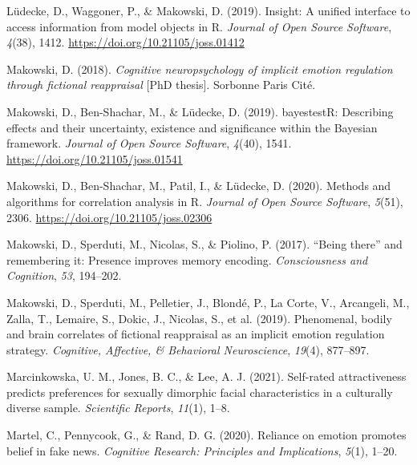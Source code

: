 \documentclass[
  man,floatsintext]{apa6}
\newlength{\cslhangindent}
\newlength{\cslentryspacingunit} %
\newenvironment{CSLReferences}[2] %
 {%
  \setlength{\parindent}{0pt}
  \ifodd #1
  \let\oldpar\par
  \def\par{\hangindent=\cslhangindent\oldpar}
  \fi
  \setlength{\parskip}{#2\cslentryspacingunit}
 }%
 {}
\begin{document}
\begin{CSLReferences}{1}{0}
\leavevmode{}%
Lüdecke, D., Waggoner, P., \& Makowski, D. (2019). Insight: A unified interface to access information from model objects in {R}. \emph{Journal of Open Source Software}, \emph{4}(38), 1412. \url{https://doi.org/10.21105/joss.01412}

\leavevmode{}%
Makowski, D. (2018). \emph{Cognitive neuropsychology of implicit emotion regulation through fictional reappraisal} {[}PhD thesis{]}. Sorbonne Paris Cit{é}.

\leavevmode{}%
Makowski, D., Ben-Shachar, M., \& Lüdecke, D. (2019). {bayestestR}: Describing effects and their uncertainty, existence and significance within the {Bayesian} framework. \emph{Journal of Open Source Software}, \emph{4}(40), 1541. \url{https://doi.org/10.21105/joss.01541}

\leavevmode{}%
Makowski, D., Ben-Shachar, M., Patil, I., \& Lüdecke, D. (2020). Methods and algorithms for correlation analysis in {R}. \emph{Journal of Open Source Software}, \emph{5}(51), 2306. \url{https://doi.org/10.21105/joss.02306}

\leavevmode{}%
Makowski, D., Sperduti, M., Nicolas, S., \& Piolino, P. (2017). {``Being there''} and remembering it: Presence improves memory encoding. \emph{Consciousness and Cognition}, \emph{53}, 194--202.

\leavevmode{}%
Makowski, D., Sperduti, M., Pelletier, J., Blondé, P., La Corte, V., Arcangeli, M., Zalla, T., Lemaire, S., Dokic, J., Nicolas, S., et al. (2019). Phenomenal, bodily and brain correlates of fictional reappraisal as an implicit emotion regulation strategy. \emph{Cognitive, Affective, \& Behavioral Neuroscience}, \emph{19}(4), 877--897.

\leavevmode{}%
Marcinkowska, U. M., Jones, B. C., \& Lee, A. J. (2021). Self-rated attractiveness predicts preferences for sexually dimorphic facial characteristics in a culturally diverse sample. \emph{Scientific Reports}, \emph{11}(1), 1--8.

\leavevmode{}%
Martel, C., Pennycook, G., \& Rand, D. G. (2020). Reliance on emotion promotes belief in fake news. \emph{Cognitive Research: Principles and Implications}, \emph{5}(1), 1--20.


\end{CSLReferences}
\end{document}
